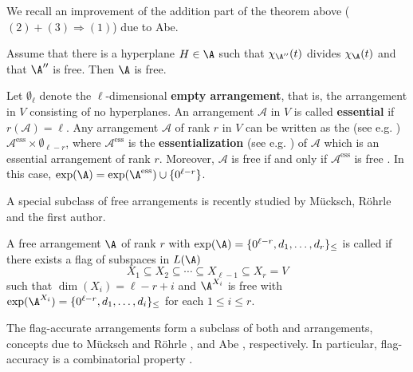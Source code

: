 We recall an improvement of the addition part of the theorem above ($(2)+(3) \Rightarrow (1)$) due to Abe.

 \begin{theorem}
 \label{thm:DT}
Assume that there is a hyperplane $H \in\A$ such that $\chi_{\A''}(t)$ divides $\chi_{\A}(t)$  and that $\A''$ is free. Then $\A$ is free.
\end{theorem}

Let $\emptyset_{\ell} $ denote the $ \ell $-dimensional \textbf{empty arrangement}, that is, the arrangement in $ V $ consisting of no hyperplanes. 
An arrangement $ \mathcal{A} $ in $ V $ is called \textbf{essential} if $ r(\mathcal{A}) = \ell $. 
Any arrangement $ \mathcal{A} $ of rank $r$ in $V$ can be written as the  (see e.g. \cite[Definition 2.13]{OT92})  $ \mathcal{A}^{\mathrm{ess}} \times\emptyset_{\ell-r}$, where  $\mathcal{A}^{\mathrm{ess}}$ is the \textbf{essentialization} (see e.g. \cite[\S1.1]{St07}) of $ \mathcal{A} $ which is an essential arrangement   of rank $r$. 
Moreover, $ \mathcal{A} $ is free if and only if $ \mathcal{A}^{\mathrm{ess}} $ is free \cite[Proposition 4.28]{OT92}. 
In this case, $ \exp (\A ) = \exp (\A^{\mathrm{ess}} ) \cup \{ 0^{\ell-r} \} $. 

A special subclass of free arrangements is recently studied by M\"ucksch, R\"ohrle and the first author.

\begin{definition}
\label{def:FA-arr}
A free arrangement $\A$ of rank $r$ with $\exp(\A) = \{0^{\ell-r}, d_1, \ldots, d_{r}\}_\leq$ is called  if there exists a flag of subspaces in $L(\A)$
$$X_1 \subseteq X_2  \subseteq \cdots  \subseteq X_{\ell-1} \subseteq X_r=V$$
such that $\dim(X_i)=\ell-r+i$ and $\A^{X_i}$ is free with  $\exp(\A^{X_i}) = \{0^{\ell-r}, d_1, \ldots, d_i\}_ \leq$ for  each $1 \le i \le r$.
\end{definition}

The flag-accurate arrangements form a subclass of both  and  arrangements, concepts due to M\"ucksch and R\"ohrle \cite{MR21}, and Abe \cite{Abe16}, respectively.
In particular,  flag-accuracy is a combinatorial property  \cite[Remark 1.3]{MRT24}.

